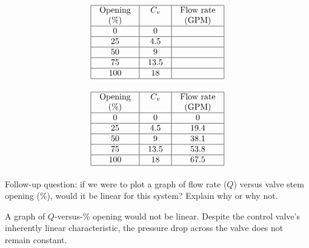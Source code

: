$$\vbox{\offinterlineskip
\halign{\strut
\vrule \quad\hfil # \ \hfil & 
\vrule \quad\hfil # \ \hfil & 
\vrule \quad\hfil # \ \hfil \vrule \cr
\noalign{\hrule}
%
Opening & $C_v$ & Flow rate \cr
%
(\%) &  & (GPM) \cr
%
\noalign{\hrule}
%
0 & 0 & \cr
%
\noalign{\hrule}
%
25 & 4.5 & \cr
%
\noalign{\hrule}
%
50 & 9 & \cr
%
\noalign{\hrule}
%
75 & 13.5 & \cr
%
\noalign{\hrule}
%
100 & 18 & \cr
%
\noalign{\hrule}
} %
}$$ %







$$\vbox{\offinterlineskip
\halign{\strut
\vrule \quad\hfil # \ \hfil & 
\vrule \quad\hfil # \ \hfil & 
\vrule \quad\hfil # \ \hfil \vrule \cr
\noalign{\hrule}
%
Opening & $C_v$ & Flow rate \cr
%
(\%) &  & (GPM) \cr
%
\noalign{\hrule}
%
0 & 0 & 0 \cr
%
\noalign{\hrule}
%
25 & 4.5 & 19.4 \cr
%
\noalign{\hrule}
%
50 & 9 & 38.1 \cr
%
\noalign{\hrule}
%
75 & 13.5 & 53.8 \cr
%
\noalign{\hrule}
%
100 & 18 & 67.5 \cr
%
\noalign{\hrule}
} %
}$$ %

\vskip 10pt

Follow-up question: if we were to plot a graph of flow rate ($Q$) versus valve stem opening (\%), would it be linear for this system?  Explain why or why not.







A graph of $Q$-versus-\% opening would not be linear.  Despite the control valve's inherently linear characteristic, the pressure drop across the valve does not remain constant.




